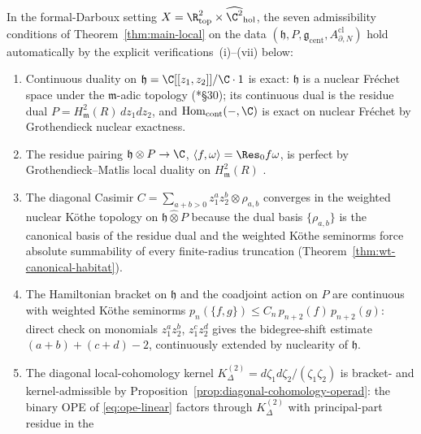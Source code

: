 \begin{lem}
\label{lem:admissibility-automatic}
In the formal-Darboux setting
$X=\R^2_{\mathrm{top}}\times\widehat{\C^2}_{\mathrm{hol}}$, the seven
admissibility conditions of Theorem~\ref{thm:main-local} on the data
$(\mathfrak h,P,\widehat{\mathfrak g}_{\mathrm{cent}},
A^{\mathrm{cl}}_{\partial,N})$ hold automatically by the explicit
verifications~(i)--(vii) below:
\begin{enumerate}[label=\textup{(\roman*)}]
  \item Continuous duality on
        \(\mathfrak h=\C[[z_1,z_2]]/\C\cdot 1\) is exact:
        \(\mathfrak h\) is a nuclear Fréchet space under the
        \(\mathfrak m\)-adic topology
        (\cite{kothe-topological-vector-spaces}*{\S 30}); its
        continuous dual is the residue dual
        \(P=H^2_{\mathfrak m}(R)\,dz_1dz_2\), and
        \(\mathrm{Hom}_{\mathrm{cont}}(-,\C)\) is exact on nuclear
        Fréchet by Grothendieck nuclear exactness.
  \item The residue pairing \(\mathfrak h\otimes P\to\C\),
        \(\langle f,\omega\rangle=\Res_0 f\omega\), is perfect by
        Grothendieck--Matlis local duality on
        \(H^2_{\mathfrak m}(R)\)
        \cite{hartshorne-local-cohomology}\cite{kunz-residues-duality}.
  \item The diagonal Casimir
        \(C=\sum_{a+b>0}z_1^az_2^b\otimes\rho_{a,b}\) converges in the
        weighted nuclear Köthe topology on
        \(\mathfrak h\widehat\otimes P\) because the dual basis
        \(\{\rho_{a,b}\}\) is the canonical basis of the residue dual
        and the weighted Köthe seminorms force absolute summability
        of every finite-radius truncation
        (Theorem~\ref{thm:wt-canonical-habitat}).
  \item The Hamiltonian bracket on \(\mathfrak h\) and the coadjoint
        action on \(P\) are continuous with weighted Köthe seminorms
        \(p_n(\{f,g\})\leq C_n\,p_{n+2}(f)\,p_{n+2}(g)\): direct check
        on monomials \(z_1^az_2^b\), \(z_1^cz_2^d\) gives the
        bidegree-shift estimate \((a+b)+(c+d)-2\), continuously
        extended by nuclearity of \(\mathfrak h\).
  \item The diagonal local-cohomology kernel
        \(K^{(2)}_\Delta=d\zeta_1d\zeta_2/(\zeta_1\zeta_2)\) is
        bracket- and kernel-admissible by
        Proposition~\ref{prop:diagonal-cohomology-operad}: the
        binary OPE of \eqref{eq:ope-linear} factors through
        \(K^{(2)}_\Delta\) with principal-part residue in the

\end{enumerate}
\end{lem}
